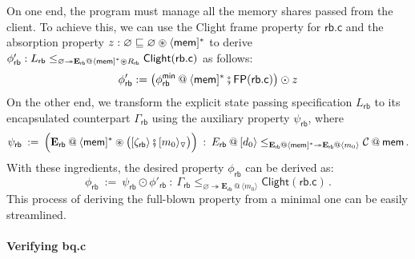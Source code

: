 \documentclass[acmsmall,nonacm]{acmart}
\newcommand{\kw}[1]{\ensuremath{ \mathsf{#1} }}
\newcommand{\vcomp}{\fatsemi}
\newcommand{\sepconj}{\oast}
\begin{document}
On one end,
the program must manage
all the memory shares passed
from the client.
To achieve this,
we can use the Clight frame property for $\kw{rb.c}$
and the absorption property
$z : \varnothing \sqsubseteq \varnothing \sepconj \langle\kw{mem}]^*$
to derive
$\phi'_\kw{rb} : L_\kw{rb} \le_{\varnothing
  \twoheadrightarrow \mathbf{E}_\kw{rb} @ \langle\kw{mem}{]}^* \sepconj R_\kw{rb}}
\kw{Clight}(\kw{rb.c})
$ as follows:
\[
  \phi'_\kw{rb} :=
  \big(
    \phi_\kw{rb}^\kw{min} \mathbin@ \langle \kw{mem} ]^*
    \vcomp
    \kw{FP}(\kw{rb.c})
    \big) \odot z
\]%
On the other end,
we transform
the explicit state passing specification
$L_\kw{rb}$
to its encapsulated counterpart
$\Gamma_\kw{rb}$
using the auxiliary property
$\psi_\kw{rb}$,
where
\[
  \psi_\kw{rb} \: := \:
  \Big(
      \mathbf{E}_\kw{rb} \mathbin@
      \langle \kw{mem} ]^* \sepconj
      \big(
        [\zeta_\kw{rb} \rangle \vcomp [m_0\rangle_\triangledown
      \big)
      \Big)
      \: : \:
      E_\kw{rb} \mathbin@ [d_0\rangle
      \le_{\mathbf{E}_\kw{rb} \mathbin@ \langle \kw{mem}]^* \twoheadrightarrow
        \mathbf{E}_\kw{rb} \mathbin@ \langle m_0 \rangle}
      \mathcal{C} \mathbin@ \kw{mem}
  \,.
\]
With these ingredients,
the desired property $\phi_\kw{rb}$
can be derived as:
\[
  \phi_\kw{rb} \: := \:
    \psi_\kw{rb} \odot \phi'_\kw{rb}
  \: : \:
  \Gamma_\kw{rb}
    \le_{\varnothing \twoheadrightarrow
      \mathbf{E}_\kw{rb} \mathbin@
        \langle m_0 \rangle}
    \kw{Clight}(\kw{rb.c})
  \,.
\]
This process of
deriving the full-blown property
from a minimal one
can be easily streamlined.

\paragraph{Verifying bq.c}
\end{document}
